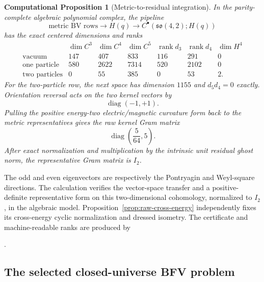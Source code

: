 \documentclass[11pt]{article}
\newtheorem{cproposition}[theorem]{Computational Proposition}
\theoremstyle{definition}
\theoremstyle{remark}
\newcommand{\rank}{\operatorname{rank}}
\begin{document}
\begin{cproposition}[Metric-to-residual integration]
\label{prop:metric-residual-integration}
In the parity-complete algebraic polynomial complex, the pipeline
\begin{equation}
 \text{metric BV rows}\longrightarrow
 H(q)\longrightarrow
 C^\bullet(\mathfrak{so}(4,2);H(q))
\end{equation}
has the exact centered dimensions and ranks
\begin{equation}\label{eq:integrated-rank-table}
\begin{array}{c|rrr|rr|r}
 &\dim C^3&\dim C^4&\dim C^5&\rank d_3&\rank d_4&\dim H^4\\
\hline
\text{vacuum}&147&407&833&116&291&0\\
\text{one particle}&580&2622&7314&520&2102&0\\
\text{two particles}&0&55&385&0&53&2.
\end{array}
\end{equation}
For the two-particle row, the next space has dimension $1155$ and
$d_5d_4=0$ exactly.  Orientation reversal acts on the two kernel vectors by
\begin{equation}
 \operatorname{diag}(-1,+1).
\end{equation}
Pulling the positive energy-two electric/magnetic curvature form back to
the metric representatives gives the raw kernel Gram matrix
\begin{equation}
 \operatorname{diag}\!\left(\frac5{64},5\right).
\end{equation}
After exact normalization and multiplication by the intrinsic unit residual
ghost norm, the representative Gram matrix is $I_2$.
\end{cproposition}

The odd and even eigenvectors are respectively the Pontryagin and
Weyl-square directions.  The calculation verifies the vector-space transfer
and a positive-definite representative form on this two-dimensional
cohomology, normalized to $I_2$, in the algebraic model.
Proposition~\ref{prop:raw-cross-energy} independently fixes its
cross-energy cyclic normalization and dressed isometry.  The certificate and
machine-readable ranks are produced by
\begin{center}
.
\end{center}

\subsection{The selected closed-universe BFV problem}
\end{document}
